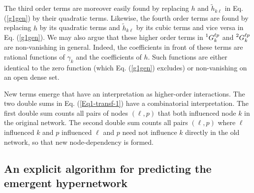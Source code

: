 \documentclass[12pt]{article}
\theoremstyle{plain}
\theoremstyle{definition}
\theoremstyle{remark}
\theoremstyle{remark}
\begin{document}
The third order terms are moreover easily found by replacing $h$ and  $\tilde{h}_{k \ell}$ in Eq. (\ref{g1gen}) by their quadratic terms. Likewise, the fourth order terms are found by replacing  $h$ by its quadratic terms and $\tilde{h}_{k \ell}$ by its cubic terms and vice versa in Eq.  (\ref{g1gen}). We may also argue that these higher order terms in $\prescript{1}{}{G}_{k}^{\ell p}$ and $\prescript{2}{}{G}_{k}^{\ell p}$ are non-vanishing in general. Indeed, the coefficients in front of these terms are rational functions of $\gamma_k$ and the coefficients of $h$. Such functions are either identical to the zero function (which Eq.  (\ref{g1gen}) excludes) or non-vanishing on an open dense set.

New terms emerge that have an interpretation as higher-order interactions. The two double sums in Eq. (\ref{Eq1-transf-1}) have a combinatorial interpretation. The first double sum counts all pairs of nodes $(\ell, p)$ that both influenced node $k$ in the original network. The second double sum counts all pairs $(\ell, p)$ where $\ell$ influenced $k$ and $p$ influenced $\ell$ and $p$ need not influence $k$ directly in the old network, so that new node-dependency is formed. 

\subsection*{An explicit algorithm for predicting the emergent hypernetwork}
\end{document}
